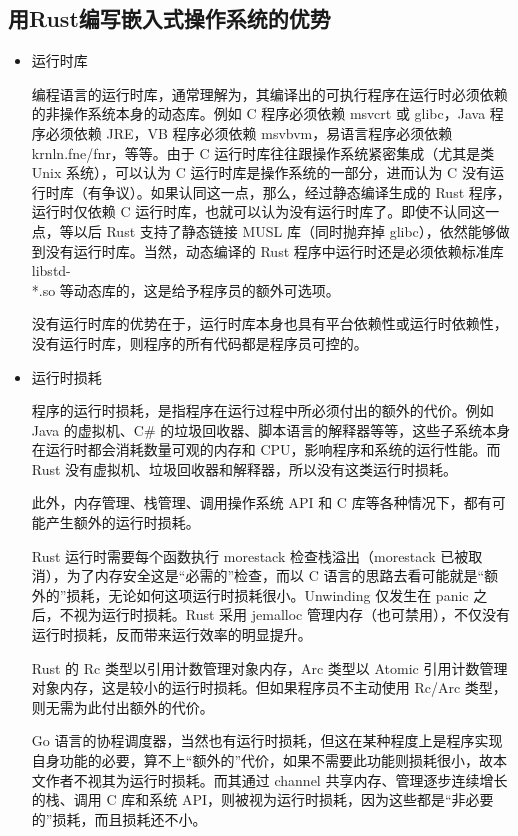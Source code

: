 \documentclass[12pt, a4paper]{article}
\begin{document}
	\subsection {用Rust编写嵌入式操作系统的优势}
	\begin{itemize}
		\item 运行时库
		
		编程语言的运行时库，通常理解为，其编译出的可执行程序在运行时必须依赖的非操作系统本身的动态库。例如 C 程序必须依赖 msvcrt 或 glibc，Java 程序必须依赖 JRE，VB 程序必须依赖 msvbvm，易语言程序必须依赖 krnln.fne/fnr，等等。由于 C 运行时库往往跟操作系统紧密集成（尤其是类 Unix 系统），可以认为 C 运行时库是操作系统的一部分，进而认为 C 没有运行时库（有争议）。如果认同这一点，那么，经过静态编译生成的 Rust 程序，运行时仅依赖 C 运行时库，也就可以认为没有运行时库了。即使不认同这一点，等以后 Rust 支持了静态链接 MUSL 库（同时抛弃掉 glibc），依然能够做到没有运行时库。当然，动态编译的 Rust 程序中运行时还是必须依赖标准库 libstd-\\*.so 等动态库的，这是给予程序员的额外可选项。
		
		没有运行时库的优势在于，运行时库本身也具有平台依赖性或运行时依赖性，没有运行时库，则程序的所有代码都是程序员可控的。
		
		\item 运行时损耗
		
		程序的运行时损耗，是指程序在运行过程中所必须付出的额外的代价。例如 Java 的虚拟机、C\# 的垃圾回收器、脚本语言的解释器等等，这些子系统本身在运行时都会消耗数量可观的内存和 CPU，影响程序和系统的运行性能。而 Rust 没有虚拟机、垃圾回收器和解释器，所以没有这类运行时损耗。
		
		此外，内存管理、栈管理、调用操作系统 API 和 C 库等各种情况下，都有可能产生额外的运行时损耗。
		
		Rust 运行时需要每个函数执行 morestack 检查栈溢出（morestack 已被取消），为了内存安全这是“必需的”检查，而以 C 语言的思路去看可能就是“额外的”损耗，无论如何这项运行时损耗很小。Unwinding 仅发生在 panic 之后，不视为运行时损耗。Rust 采用 jemalloc 管理内存（也可禁用），不仅没有运行时损耗，反而带来运行效率的明显提升。
		
		Rust 的 Rc 类型以引用计数管理对象内存，Arc 类型以 Atomic 引用计数管理对象内存，这是较小的运行时损耗。但如果程序员不主动使用 Rc/Arc 类型，则无需为此付出额外的代价。
		
		Go 语言的协程调度器，当然也有运行时损耗，但这在某种程度上是程序实现自身功能的必要，算不上“额外的”代价，如果不需要此功能则损耗很小，故本文作者不视其为运行时损耗。而其通过 channel 共享内存、管理逐步连续增长的栈、调用 C 库和系统 API，则被视为运行时损耗，因为这些都是“非必要的”损耗，而且损耗还不小。
		

\end{itemize}
\end{document}
